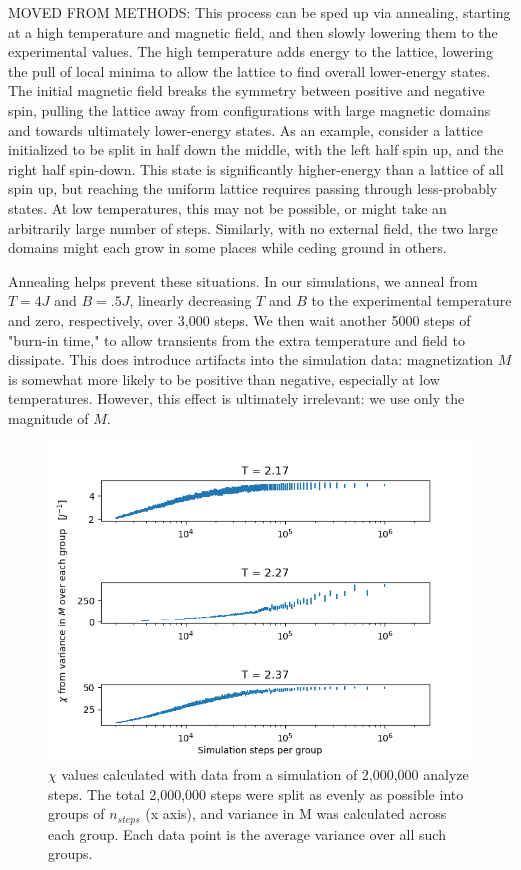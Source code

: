 \documentclass[letter,scriptaddress,twocolumn, prl,nofootinbib]{revtex4}
\begin{document}
MOVED FROM METHODS: This process can be sped up via annealing, starting at a high temperature and magnetic field, and then slowly lowering them to the experimental values. The high temperature adds energy to the lattice, lowering the pull of local minima to allow the lattice to find overall lower-energy states. The initial magnetic field breaks the symmetry between positive and negative spin, pulling the lattice away from configurations with large magnetic domains and towards ultimately lower-energy states. As an example, consider a lattice initialized to be split in half down the middle, with the left half spin up, and the right half spin-down. This state is significantly higher-energy than a lattice of all spin up, but reaching the uniform lattice requires passing through less-probably states. At low temperatures, this may not be possible, or might take an arbitrarily large number of steps. Similarly, with no external field, the two large domains might each grow in some places while ceding ground in others. 

Annealing helps prevent these situations. In our simulations, we anneal from $T = 4 J$ and $B = .5 J$, linearly decreasing $T$ and $B$ to the experimental temperature and zero, respectively, over 3,000 steps. We then wait another 5000 steps of "burn-in time," to allow transients from the extra temperature and field to dissipate. This does introduce artifacts into the simulation data: magnetization $M$ is somewhat more likely to be positive than negative, especially at low temperatures. However, this effect is ultimately irrelevant: we use only the magnitude of $M$.

\begin{figure}[h]
	\begin{center}
		\includegraphics[width=.4\textwidth]{figs/figA1.png}
		\caption{$\chi$ values calculated with data from a simulation of 2,000,000 analyze steps. The total 2,000,000 steps were split as evenly as possible into groups of $n_{steps}$ (x axis), and variance in M was calculated across each group. Each data point is the average variance over all such groups.}
		\label{fig:figA1}
	\end{center}
\end{figure}
\end{document}
